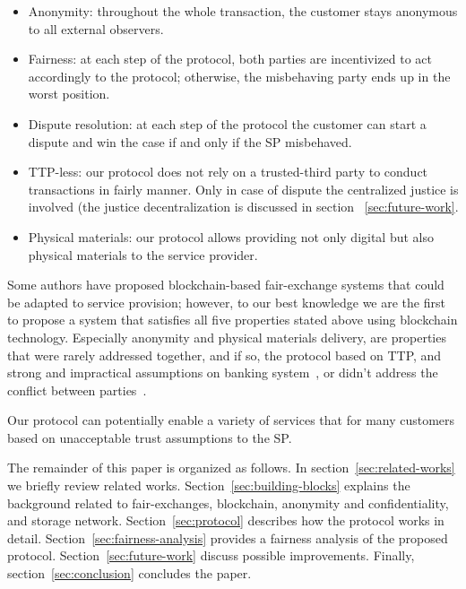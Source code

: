 \documentclass{ieeeaccess}
\begin{document}
\begin{itemize}
\item Anonymity:
throughout the whole transaction, the customer stays anonymous to all external observers.
\item Fairness:
at each step of the protocol, both parties are incentivized to act accordingly to the protocol; otherwise, the misbehaving party ends up in the worst position.
\item Dispute resolution: at each step of the protocol the customer can start a dispute and win the case if and only if the SP misbehaved.

\item TTP-less: 
our protocol does not rely on a trusted-third party to conduct transactions in fairly manner. Only in case of dispute   the centralized justice is involved (the justice decentralization is discussed in section ~\ref{sec:future-work}.
\item Physical materials: our protocol allows providing not only digital but also physical materials to the service provider.
\end{itemize}

Some authors have proposed blockchain-based fair-exchange systems that could be adapted to service provision; however, to our best knowledge we
are the first to propose a system that satisfies all five properties
stated above using blockchain technology. Especially anonymity and physical materials delivery, are
properties that were rarely addressed together, and if so, the protocol
based on TTP, and strong and impractical assumptions on banking system~\cite{birjoveanu2015anonymity}, or didn't address the conflict
between parties~\cite{altawy2017lelantos}.

Our protocol can potentially enable a variety of services that for many
customers based on unacceptable trust assumptions to the SP.

The remainder of this paper is organized as follows.
In section~\ref{sec:related-works} we briefly review related works. 
Section~\ref{sec:building-blocks} explains the background related to fair-exchanges, blockchain, anonymity and confidentiality, and storage network. 
Section~\ref{sec:protocol} describes how the protocol works in detail.
Section~\ref{sec:fairness-analysis} provides a fairness analysis of the proposed protocol.
Section~\ref{sec:future-work} discuss possible improvements. 
Finally, section~\ref{sec:conclusion} concludes the paper.
\end{document}
